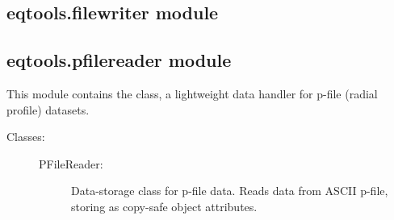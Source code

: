 \documentclass[letterpaper,10pt,english]{sphinxmanual}
\begin{document}
\subsection{eqtools.filewriter module}
\label{\detokenize{eqtools:eqtools-filewriter-module}}

\subsection{eqtools.pfilereader module}
\label{\detokenize{eqtools:module-eqtools.pfilereader}}\label{\detokenize{eqtools:eqtools-pfilereader-module}}
This module contains the {\hyperref[\detokenize{eqtools:eqtools.pfilereader.PFileReader}]{}} class, a lightweight data
handler for p-file (radial profile) datasets.
\begin{description}
\item[{Classes:}] \leavevmode\begin{description}
\item[{PFileReader:}] \leavevmode
Data-storage class for p-file data.  Reads
data from ASCII p-file, storing as copy-safe object
attributes.

\end{description}

\end{description}
\end{document}
